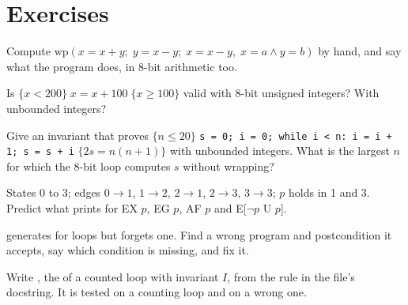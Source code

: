 \section{Exercises}\label{sec:b3:program-verification:exercises}

\begin{exercise}[$\star$]\label{exo:b3:program-verification:1}
Compute $\mathrm{wp}(x = x + y;\; y = x - y;\; x = x - y,\; x = a \wedge y = b)$ by hand, and say what the program does, in 8-bit arithmetic too.
\end{exercise}

\begin{exercise}[$\star$]\label{exo:b3:program-verification:2}
Is $\{x < 200\}\; x = x + 100\; \{x \ge 100\}$ valid with 8-bit unsigned integers? With unbounded integers?
\end{exercise}

\begin{exercise}[$\star$]\label{exo:b3:program-verification:3}
Give an invariant that proves $\{n \le 20\}$ \texttt{s = 0; i = 0; while i < n:\ i = i + 1; s = s + i} $\{2s = n(n + 1)\}$ with unbounded integers. What is the largest $n$ for which the 8-bit loop computes $s$ without wrapping?
\end{exercise}

\begin{exercise}[$\star$]\label{exo:b3:program-verification:4}
States 0 to 3; edges $0 \to 1$, $1 \to 2$, $2 \to 1$, $2 \to 3$, $3 \to 3$; $p$ holds in 1 and 3. Predict what  prints for EX $p$, EG $p$, AF $p$ and E[$\neg p$ U $p$].
\end{exercise}

\begin{exercise}[$\star\star$]\label{exo:b3:program-verification:5}
 generates  for loops but forgets one. Find a wrong program and postcondition it accepts, say which condition is missing, and fix it.
\end{exercise}

\begin{exercise}[$\star\star$]\label{exo:b3:program-verification:6}
Write , the  of a counted loop  with invariant $I$, from the rule in the file's docstring. It is tested on a counting loop and on a wrong one.
\end{exercise}

